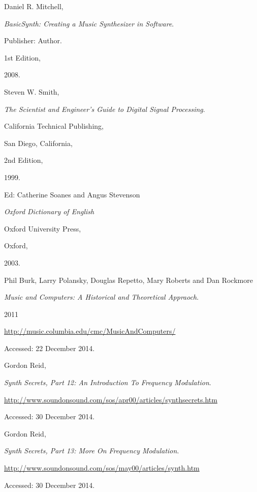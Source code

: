\documentclass[12pt,twoside]{report}
\begin{document}
\begin{thebibliography}{99}


Daniel R. Mitchell,

\emph{BasicSynth: Creating a Music Synthesizer in Software}.

Publisher: Author.

1st Edition,

2008.


Steven W. Smith,

\emph{The Scientist and Engineer's Guide to Digital Signal Processing}.

California Technical Publishing,

San Diego, California,

2nd Edition,

1999.


Ed: Catherine Soanes and Angus Stevenson

\emph{Oxford Dictionary of English}

Oxford University Press,

Oxford,

2003.


Phil Burk, Larry Polansky, Douglas Repetto, Mary Roberts and Dan Rockmore

\emph{Music and Computers: A Historical and Theoretical Appraoch}.

2011

\url{http://music.columbia.edu/cmc/MusicAndComputers/}

Accessed: 22 December 2014.


Gordon Reid,

\emph{Synth Secrets, Part 12: An Introduction To Frequency Modulation}.

\url{http://www.soundonsound.com/sos/apr00/articles/synthsecrets.htm}

Accessed: 30 December 2014.


Gordon Reid,

\emph{Synth Secrets, Part 13: More On Frequency Modulation}.

\url{http://www.soundonsound.com/sos/may00/articles/synth.htm}

Accessed: 30 December 2014.


\end{thebibliography}
\end{document}
